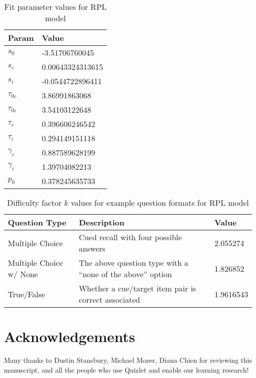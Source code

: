 \documentclass[a4paper,12pt]{article}
\begin{document}
\begin{table}[H]
\centering
\begin{tabular}{|l|l|}
\hline
\textbf{Param} & \textbf{Value} \\
\hline
$s_0$ & -3.51706760045 \\
$s_c$ & 0.00643324313615 \\
$s_i$ & -0.0544722896411 \\
$\tau_{0c}$ & 3.86991863068 \\
$\tau_{0i}$ & 3.54103122648 \\
$\tau_c$ & 0.396606246542 \\
$\tau_i$ & 0.294149151118 \\
$\gamma_c$ & 0.887589628199 \\
$\gamma_i$ & 1.39704082213 \\
$p_0$ & 0.378245635733 \\
\hline
\end{tabular}
\caption{Fit parameter values for RPL model}
\end{table}

\begin{table}[H]
\centering
\begin{tabular}{|l|p{6cm}|l|}
\hline
\textbf{Question Type} & \textbf{Description} & \textbf{Value}\\
\hline
Multiple Choice & Cued recall with four possible answers & 2.055274 \\
\hline
Multiple Choice w/ None & The above question type with a ``none of the above'' option & 1.826852 \\
\hline
True/False & Whether a cue/target item pair is correct associated & 1.9616543 \\
\hline
\end{tabular}
\caption{Difficulty factor $k$ values for example question formats for RPL model}
\end{table}


\section*{Acknowledgements}
Many thanks to Dustin Stansbury, Michael Mozer, Diana Chien for reviewing this manuscript, and all the people who use Quizlet and enable our learning research!
\end{document}
